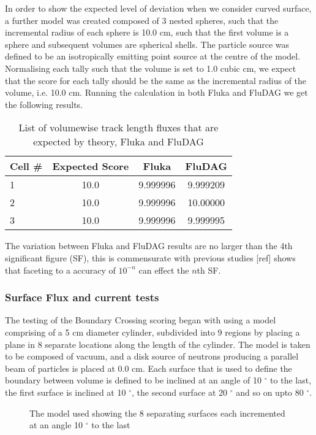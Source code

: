 \documentclass{anstrans}
\begin{document}
In order to show the expected level of deviation when we consider
curved surface, a further model was created composed of 3 nested
spheres, such that the incremental radius of each sphere is 10.0 cm,
such that the first volume is a sphere and subsequent volumes are
spherical shells. The particle source was defined to be an
isotropically emitting point source at the centre of the
model. Normalising each tally such that the volume is set to 1.0 cubic
cm, we expect that the score for each tally should be the same as the
incremental radius of the volume, i.e. 10.0 cm. Running the calculation
in both Fluka and FluDAG we get the following results.
\begin{table}[h!]
	\begin{center}
		\begin{tabular}{|l|c|c|c|}
			\hline
			Cell \# & Expected Score & Fluka  & FluDAG \\
			\hline
			1 & 10.0 & 9.999996 & 9.999209 \\
			2 & 10.0 & 9.999996 & 10.00000 \\
			3 & 10.0 & 9.999996 & 9.999995 \\
			\hline
		\end{tabular}
		\caption{List of volumewise track length fluxes that are 
			expected by theory, Fluka and FluDAG}
	\end{center}
\label{usrtrack_comp_sphere}
\end{table}
The variation between Fluka and FluDAG results are no larger than the
4th significant figure (SF), this is commensurate with previous
studies [ref] shows that faceting to a accuracy of $10^{-n}$ can
effect the $n$th SF.

\subsubsection*{Surface Flux and current tests}
The testing of the Boundary Crossing scoring began with using a model
comprising of a 5 cm diameter cylinder, subdivided into 9 regions by
placing a plane in 8 separate locations along the length of the
cylinder. The model is taken to be composed of vacuum, and a disk
source of neutrons producing a parallel beam of particles is placed at
0.0 cm. Each surface that is used to define the boundary between
volume is defined to be inclined at an angle of 10 $^{\circ}$ to the
last, the first surface is inclined at 10 $^{\circ}$, the second
surface at 20 $^{\circ}$ and so on upto 80 $^{\circ}$.

\begin{figure}[h!]
	\begin{center}
		\caption{The model used showing the 8 separating surfaces each
		incremented at an angle 10 $^{\circ}$ to the last}
	\end{center}
\end{figure}
\end{document}
